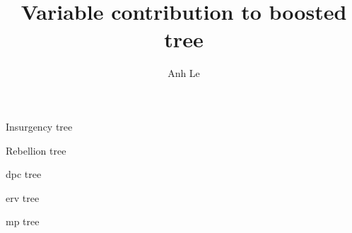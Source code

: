 \documentclass[]{article}
\title{Variable contribution to boosted tree}
\author{Anh Le}
\begin{document}
\maketitle

\begin{table}
\centering
	
	\caption{Insurgency tree}
\end{table}

\begin{table}
\centering
	
	\caption{Rebellion tree}
\end{table}

\begin{table}
\centering
	
	\caption{dpc tree}
\end{table}

\begin{table}
\centering
	
	\caption{erv tree}
\end{table}

\begin{table}
\centering
	
	\caption{mp tree}
\end{table}
\end{document}
